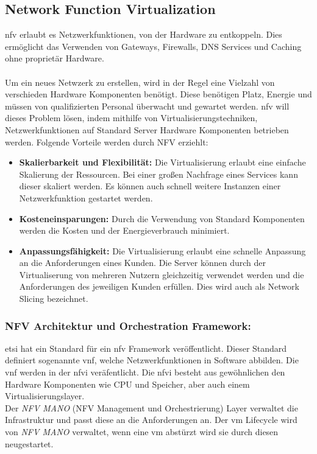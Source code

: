 \documentclass[runningheads]{llncs}
\numberwithin{figure}{section}
\begin{document}
\subsection{Network Function Virtualization}
\label{subsec:Network Function Virtualization}
\acrfull{nfv} erlaubt es Netzwerkfunktionen, von der Hardware zu entkoppeln.
Dies ermöglicht das Verwenden von Gateways, Firewalls, DNS Services und Caching ohne proprietär Hardware.
\\
\\
Um ein neues Netwzerk zu erstellen, wird in der Regel eine Vielzahl von verschieden Hardware Komponenten benötigt. 
Diese benötigen Platz, Energie und müssen von qualifizierten Personal überwacht und gewartet werden. 
\acrlong{nfv} will dieses Problem lösen, indem mithilfe von Virtualisierungstechniken, Netzwerkfunktionen auf Standard
Server Hardware Komponenten betrieben werden. 
Folgende Vorteile werden durch NFV erziehlt: \cite{nfv_wp}
\begin{itemize}
  \item \textbf{Skalierbarkeit und Flexibilität:} Die Virtualisierung erlaubt eine einfache Skalierung der Ressourcen.
  Bei einer großen Nachfrage eines Services kann dieser skaliert werden. Es können auch schnell weitere Instanzen einer Netzwerkfunktion gestartet werden.
  \item \textbf{Kosteneinsparungen:} Durch die Verwendung von Standard Komponenten werden die Kosten und der Energieverbrauch minimiert.
  \item \textbf{Anpassungsfähigkeit:} Die Virtualisierung erlaubt eine schnelle Anpassung an die Anforderungen eines Kunden. 
  Die Server können durch der Virtualiserung von mehreren Nutzern gleichzeitig verwendet werden und die Anforderungen des jeweiligen
  Kunden erfüllen. Dies wird auch als Network Slicing bezeichnet.
\end{itemize}


\subsubsection{NFV Architektur und Orchestration Framework:}
\acrshort{etsi} hat ein Standard für ein \acrshort{nfv} Framework veröffentlicht.
Dieser Standard definiert sogenannte \acrfull{vnf}, welche Netzwerkfunktionen in Software abbilden.
Die \acrshort{vnf} werden in der \acrfull{nfvi} veräfentlicht. Die \acrshort{nfvi} besteht aus gewöhnlichen
den Hardware Komponenten wie CPU und Speicher, aber auch einem Virtualisierungslayer. \\
Der \textit{NFV MANO} (NFV Management und Orchestrierung) Layer verwaltet die Infrastruktur und passt diese an die Anforderungen an.
Der \acrfull{vm} Lifecycle wird von \textit{NFV MANO} verwaltet, wenn eine \acrshort{vm} abstürzt wird sie durch diesen neugestartet.
\end{document}
